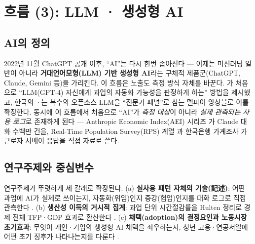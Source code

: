 \documentclass[11pt]{article}
\begin{document}
\section{흐름 (3): LLM · 생성형 AI}
\label{sec:era3}

\subsection{AI의 정의}

2022년 11월 ChatGPT 공개 이후, ``AI''는 다시 한번 좁아진다 — 이제는 머신러닝 일반이 아니라 \textbf{거대언어모형(LLM) 기반 생성형 AI}라는 구체적 제품군(ChatGPT, Claude, Gemini 등)을 가리킨다. 이 흐름은 노출도 측정 방식 자체를 바꾼다. \textcite{eloundou-2023-gpts-are-gpts-an-early}가 처음으로 ``LLM(GPT-4) 자신에게 과업의 자동화 가능성을 판정하게 하는'' 방법을 제시했고, 한국의 \textcite{son-2025-llm-based-ai-job-exposure-measurement}·\textcite{keis-2025-ai-job-exposure-labor-demand}는 복수의 오픈소스 LLM을 ``전문가 패널''로 삼는 델파이 앙상블로 이를 확장한다. 동시에 이 흐름에서 처음으로 ``AI''가 \emph{측정 대상}이 아니라 \emph{실제 관측되는 사용 로그}로 존재하게 된다 — Anthropic Economic Index(AEI) 시리즈 \parencite{handa-2025-which-economic-tasks-are,appel-2025-uneven-geographic-and-enterprise-ai,appel-2026-economic-primitives,massenkoff-2026-cadences,massenkoff-2026-learning-curves,tamkin-2025-estimating-ai-productivity-gains-from}가 Claude 대화 수백만 건을, Real-Time Population Survey(RPS) 계열 \parencite{bick-2026-mind-the-gap-ai-adoption,bick-2026-what-work-does-generative}과 한국은행 가계조사 \parencite{bok-2025-rapid-ai-diffusion-productivity-effects,bok-2026-ai-adoption-productivity-effects}가 근로자 서베이 응답을 직접 자료로 쓴다.

\subsection{연구주제와 중심변수}

연구주제가 뚜렷하게 세 갈래로 확장된다. (a) \textbf{실사용 패턴 자체의 기술(記述)}: 어떤 과업에 AI가 실제로 쓰이는지, 자동화(위임)인지 증강(협업)인지를 대화 로그로 직접 관측한다 \parencite{handa-2025-which-economic-tasks-are,appel-2025-uneven-geographic-and-enterprise-ai}. (b) \textbf{생산성 이득의 거시적 집계}: 과업 단위 시간절감률을 Hulten 정리로 경제 전체 TFP·GDP 효과로 환산한다 \parencite{acemoglu-2024-the-simple-macroeconomics-of-ai,tamkin-2025-estimating-ai-productivity-gains-from,bok-2025-rapid-ai-diffusion-productivity-effects,nam-2026-ai-macroeconomic-impact-analysis}. (c) \textbf{채택(adoption)의 결정요인과 노동시장 초기효과}: 무엇이 개인·기업의 생성형 AI 채택을 좌우하는지, 청년 고용·연공서열에 어떤 초기 징후가 나타나는지를 다룬다 \parencite{bick-2026-what-work-does-generative,bick-2026-mind-the-gap-ai-adoption,han-2025-ai-diffusion-youth-employment-decline,bok-2026-youth-employment-decline-ai-career-ladder,kim-2025-youth-job-choice-ai-exposure,min-2025-productivity-gains-generative-ai,noh-2025-ai-based-manufacturing-innovation-employment}.
\end{document}
